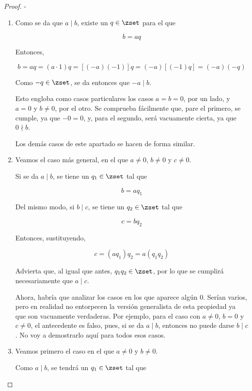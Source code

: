 \begin{proof}
  -

  \begin{enumerate}
    \item Como se da que $a \mid b$, existe un $q \in \zset$ para el que

      $$ b = aq $$

      Entonces,

      $$ b = aq = (a \cdot 1)q = \left[({-a})({-1})\right]q =
      ({-a})\left[({-1})q\right] = ({-a})({-q}) $$

      \noindent Como ${-q} \in \zset$, se da entonces que ${-a} \mid b$.

      Esto engloba como casos particulares los casos $a = b = 0$, por un
      lado, y $a = 0$ y $b \neq 0$, por el otro. Se comprueba fácilmente
      que, pare el primero, se cumple, ya que ${-0} = 0$, y, para el
      segundo, será vacuamente cierta, ya que $0 \nmid b$.

      Los demás casos de este apartado se hacen de forma similar.

    \item Veamos el caso más general, en el que $a \neq 0$, $b \neq 0$ y $c
      \neq 0$.

      Si se da $a \mid b$, se tiene un $q_1 \in \zset$ tal que

      $$ b = a q_1 $$

      Del mismo modo, si $b \mid c$, se tiene un $q_2 \in \zset$ tal que

      $$ c = b q_2 $$

      Entonces, sustituyendo,

      $$ c = (a q_1) q_2 = a (q_1 q_2) $$

      Advierta que, al igual que antes, $q_1 q_2 \in \zset$, por lo que se
      cumplirá necesariamente que $a \mid c$.

      Ahora, habría que analizar los casos en los que aparece algún 0.
      Serían varios, pero en realidad no entorpecen la versión generalista
      de esta propiedad ya que son vacuamente verdaderas. Por ejemplo, para
      el caso con $a \neq 0$, $b = 0$ y $c \neq 0$, el antecedente es falso,
      pues, si se da $a \mid b$, entonces no puede darse $b \mid c$. No voy
      a demostrarlo aquí para todos esos casos.

    \item Veamos primero el caso en el que $a \neq 0$ y $b \neq 0$.

      Como $a \mid b$, se tendrá un $q_1 \in \zset$ tal que


\end{enumerate}
\end{proof}
